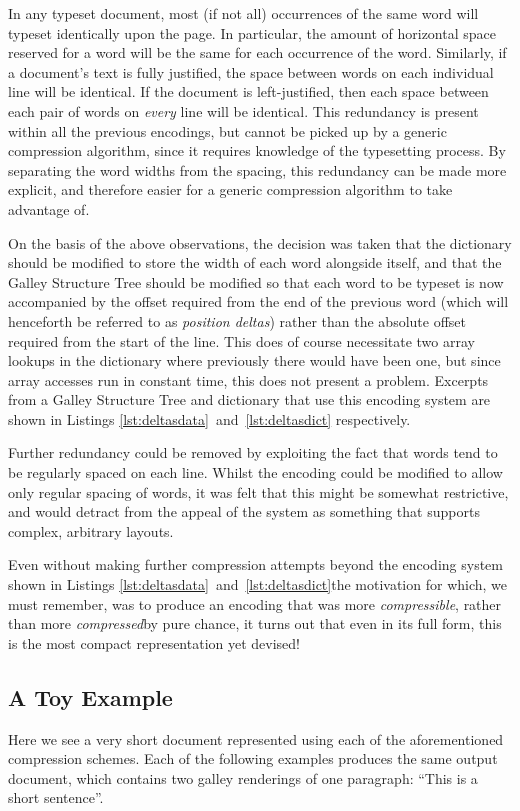 In any typeset document, most (if not all) occurrences of the same word will typeset identically upon the page. In particular, the amount of horizontal space reserved for a word will be the same for each occurrence of the word. Similarly, if a document's text is fully justified, the space between words on each individual line will be identical. If the document is left-justified, then each space between each pair of words on \emph{every} line will be identical. This redundancy is present within all the previous encodings, but cannot be picked up by a generic compression algorithm, since it requires knowledge of the typesetting process. By separating the word widths from the spacing, this redundancy can be made more explicit, and therefore easier for a generic compression algorithm to take advantage of.

On the basis of the above observations, the decision was taken that the dictionary should be modified to store the width of each word alongside itself, and that the Galley Structure Tree should be modified so that each word to be typeset is now accompanied by the offset required from the end of the previous word (which will henceforth be referred to as \emph{position deltas}) rather than the absolute offset required from the start of the line. This does of course necessitate two array lookups in the dictionary where previously there would have been one, but since array accesses run in constant time, this does not present a problem. Excerpts from a Galley Structure Tree and dictionary that use this encoding system are shown in Listings \ref{lst:deltasdata}~and~\ref{lst:deltasdict} respectively.

Further redundancy could be removed by exploiting the fact that words tend to be regularly spaced on each line. Whilst the encoding could be modified to allow only regular spacing of words, it was felt that this might be somewhat restrictive, and would detract from the appeal of the system as something that supports complex, arbitrary layouts.

Even without making further compression attempts beyond the encoding system shown in Listings \ref{lst:deltasdata}~and~\ref{lst:deltasdict}\ed the motivation for which, we must remember, was to produce an encoding that was more \emph{compressible}, rather than more \emph{compressed}\ed by pure chance, it turns out that even in its full form, this is the most compact representation yet devised!


\clearpage
\subsection{A Toy Example}
Here we see a very short document represented using each of the aforementioned compression schemes. Each of the following examples produces the same output document, which contains two \gls{galley} renderings of one paragraph: ``This is a short sentence''.

